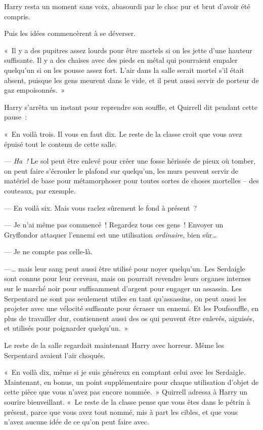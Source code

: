 Harry resta un moment sans voix, abasourdi par le choc pur et brut d'avoir été compris.

Puis les idées commencèrent à se déverser.

«~Il y a des pupitres assez lourds pour être mortels si on les jette d'une hauteur suffisante.
Il y a des chaises avec des pieds en métal qui pourraient empaler quelqu'un si on les pousse assez fort.
L'air dans la salle serait mortel s'il était absent, puisque les gens meurent dans le vide, et il peut aussi servir de porteur de gaz empoisonnés.~»

Harry s'arrêta un instant pour reprendre son souffle, et Quirrell dit pendant cette pause~:

«~En voilà trois.
Il vous en faut dix.
Le reste de la classe croit que vous avez épuisé tout le contenu de cette salle.

--- \emph{Ha~!} Le sol peut être enlevé pour créer une fosse hérissée de pieux où tomber, on peut faire s'écrouler le plafond sur quelqu'un, les murs peuvent servir de matériel de base pour métamorphoser pour toutes sortes de choses mortelles -- des couteaux, par exemple.

--- En voilà six. Mais vous raclez sûrement le fond à présent~?

--- Je n'ai même pas commencé~!
Regardez tous ces gens~!
Envoyer un Gryffondor attaquer l'ennemi est une utilisation \emph{ordinaire}, bien sûr…

--- Je ne compte pas celle-là.

---… mais leur sang peut aussi être utilisé pour noyer quelqu'un.
Les Serdaigle sont connus pour leur cerveau, mais on pourrait revendre leurs organes internes sur le marché noir pour suffisamment d'argent pour engager un assassin.
Les Serpentard ne sont pas seulement utiles en tant qu'assassins, on peut aussi les projeter avec une vélocité suffisante pour écraser un ennemi.
Et les Poufsouffle, en plus de travailler dur, contiennent aussi des os qui peuvent être enlevés, aiguisés, et utilisés pour poignarder quelqu'un.~»

Le reste de la salle regardait maintenant Harry avec horreur.
Même les Serpentard avaient l'air choqués.

«~En voilà dix, même si je suis généreux en comptant celui avec les Serdaigle.
Maintenant, en bonus, un point supplémentaire pour chaque utilisation d'objet de cette pièce que vous n'avez pas encore nommée.~»
Quirrell adressa à Harry un sourire bienveillant.
«~Le reste de la classe pense que vous êtes dans le pétrin à présent, parce que vous avez tout nommé, mis à part les cibles, et que vous n'avez aucune idée de ce qu'on peut faire avec.

